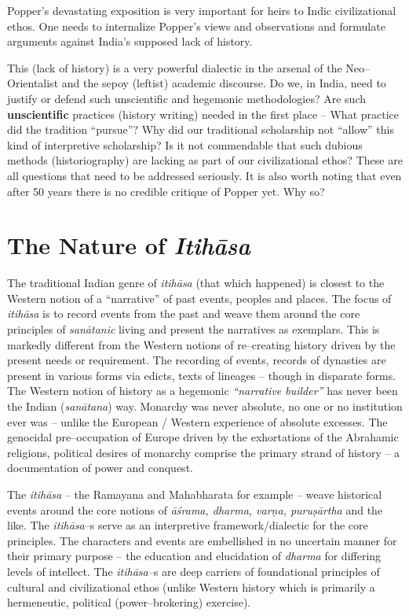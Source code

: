 Popper’s devastating exposition is very important for heirs to Indic civilizational ethos. One needs to internalize Popper’s views and observations and formulate arguments against India’s supposed lack of history. 

This (lack of history) is a very powerful dialectic in the arsenal of the Neo–Orientalist and the sepoy (leftist) academic discourse. Do we, in India, need to justify or defend such unscientific and hegemonic methodologies? Are such \textbf{unscientific} practices (history writing) needed in the first place – What practice did the tradition “pursue”? Why did our traditional scholarship not “allow” this kind of interpretive scholarship? Is it not commendable that such dubious methods (historiography) are lacking as part of our civilizational ethos? These are all questions that need to be addressed seriously. It is also worth noting that even after 50 years there is no credible critique of Popper yet. Why so?


\section*{The Nature of \textit{Itihāsa}}

The traditional Indian genre of \textit{itihāsa} (that which happened) is closest to the Western notion of a “narrative” of past events, peoples and places. The focus of \textit{itihāsa} is to record events from the past and weave them around the core principles of \textit{sanātanic} living and present the narratives as exemplars. This is markedly different from the Western notions of re–creating history driven by the present needs or requirement. The recording of events, records of dynasties are present in various forms via edicts, texts of lineages – though in disparate forms. The Western notion of history as a hegemonic \textit{“narrative builder”} has never been the Indian (\textit{sanātana}) way. Monarchy was never absolute, no one or no institution ever was – unlike the European / Western experience of absolute excesses. The genocidal pre–occupation of Europe driven by the exhortations of the Abrahamic religions, political desires of monarchy comprise the primary strand of history – a documentation of power and conquest.

The \textit{itihāsa} – the Ramayana and Mahabharata for example – weave historical events around the core notions of \textit{āśrama, dharma, varṇa, puruṣārtha} and the like. The \textit{itihāsa}–s serve as an interpretive framework/dialectic for the core principles. The characters and events are embellished in no uncertain manner for their primary purpose – the education and elucidation of \textit{dharma} for differing levels of intellect. The \textit{itihāsa–}s are deep carriers of foundational principles of cultural and civilizational ethos (unlike Western history which is primarily a hermeneutic, political (power–brokering) exercise).

